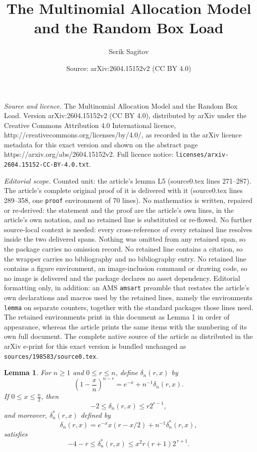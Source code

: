 \documentclass[10pt,a4paper]{amsart}
\title{The Multinomial Allocation Model and the Random Box Load}
\author{Serik Sagitov}
\date{Source: arXiv:2604.15152v2 (CC BY 4.0)}
\newtheorem{lemma}{Lemma}
\begin{document}
\maketitle

\noindent\emph{Source and licence.} The Multinomial Allocation Model and the Random Box Load. Version arXiv:2604.15152v2 (CC BY 4.0), distributed by arXiv under the Creative Commons Attribution 4.0 International licence, http://creativecommons.org/licenses/by/4.0/, as recorded in the arXiv licence metadata for this exact version and shown on the abstract page https://arxiv.org/abs/2604.15152v2. Full licence notice: \texttt{licenses/arxiv-2604.15152-CC-BY-4.0.txt}.\par\smallskip

\noindent\textit{Editorial scope.} Counted unit: the article's lemma L5 (source0.tex lines 271--287). The article's complete original proof of it is delivered with it (source0.tex lines 289--358, one \texttt{proof} environment of 70 lines). No mathematics is written, repaired or re-derived: the statement and the proof are the article's own lines, in the article's own notation, and no retained line is substituted or re-flowed.  No further source-local context is needed: every cross-reference of every retained line resolves inside the two delivered spans.  Nothing was omitted from any retained span, so the package carries no omission record.  No retained line contains a citation, so the wrapper carries no bibliography and no bibliography entry.  No retained line contains a figure environment, an image-inclusion command or drawing code, so no image is delivered and the package declares no asset dependency.  Editorial formatting only, in addition: an AMS \texttt{amsart} preamble that restates the article's own declarations and macros used by the retained lines, namely the environments \texttt{lemma} on separate counters, together with the standard packages those lines need.  The retained environments print in this document as Lemma 1 in order of appearance, whereas the article prints the same items with the numbering of its own full document.  The complete native source of the article as distributed in the arXiv e-print for this exact version is bundled unchanged as \texttt{sources/198583/source0.tex}.
\begin{lemma}\label{L5}
For $n \ge 1$ and $0\le r\le n$, define $\delta_n(r,x)$ by
\[
\left(1-\frac{x}{n}\right)^{n-r} = e^{-x} + n^{-1}\delta_n(r,x).
\]
If $0 \le x \le \frac{n}{2}$, then
\begin{equation}\label{del}
 -2 \le \delta_n(r,x) \le  r2^{r-1},
\end{equation}
and moreover, $\delta^*_n(r,x)$ defined by
\[\delta_n(r,x)=e^{-x}x(r-x/2)+n^{-1}\delta^*_n(r,x),
\]
satisfies 
\begin{equation}\label{del*}
-4-r\le \delta^*_n(r,x)\le x^2r(r+1) 2^{\,r+1}.
\end{equation}
\end{lemma}
\end{document}
